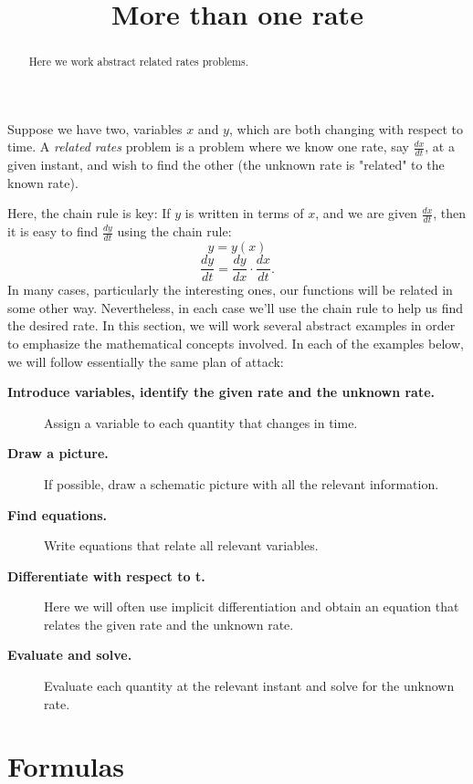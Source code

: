 \documentclass{ximera}
\title[Dig-In:]{More than one rate}
\begin{document}
\begin{abstract}
  Here we work abstract related rates problems.
\end{abstract}
\maketitle


Suppose we have two, variables $x$ and $y$, which are both changing with
respect to time.  A \textit{related rates} problem is a problem where
we know one rate, say $\frac{dx}{dt}$, at a given instant, and wish to find the other (the unknown rate is "related" to the known rate).

Here, the chain rule is key: If $y$ is written in terms of $x$, and we
are given $\frac{dx}{dt}$, then it is easy to find $\frac{dy}{dt}$ using the
chain rule:
\[
y=y(x)
\]
\[
\frac{dy}{dt}=\frac{dy}{dx}\cdot \frac{dx}{dt}.
\]
In many cases, particularly the interesting ones, our functions will
be related in some other way. Nevertheless, in each case we'll use the
 chain rule to help us find the desired rate. In this
section, we will work several abstract examples in order to emphasize
the mathematical concepts involved. In each of the examples below, we
will follow essentially the same plan of attack:



\begin{description}
\item[\textbf{Introduce variables, identify the given rate and the unknown rate.}]
               
               Assign a variable to each quantity that changes in time.
\item[\textbf{Draw a picture.}] If possible, draw a schematic picture with all the relevant information. 
\item[\textbf{Find equations.}] Write equations that relate all
  relevant variables.
\item[\textbf{Differentiate with respect to t.}] Here we will often use
  implicit differentiation and obtain an equation that relates the given rate and the unknown rate. 
\item[\textbf{Evaluate and solve.}] Evaluate
each quantity at the relevant instant and solve for the unknown rate.

\end{description}




\section{Formulas}
\end{document}
